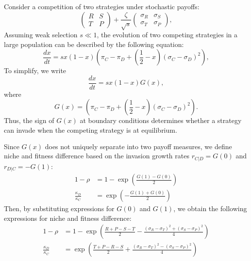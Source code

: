 \documentclass[12pt]{article}
\begin{document}
Consider a competition of two strategies under stochastic payoffs:
\begin{equation}
\begin{pmatrix}
R & S \\
T & P
\end{pmatrix} +
\frac{\zeta}{\sqrt{s}} \begin{pmatrix}
\sigma_R & \sigma_S \\
\sigma_T & \sigma_P
\end{pmatrix}, 
\end{equation}
Assuming weak selection $s\ll 1$, the evolution of two competing strategies in a large population can be described by the following equation:
\begin{equation}
\frac{dx}{dt} = s x (1-x) \left(\pi_C - \pi_D + \left(\frac{1}{2} - x \right) (\sigma_C - \sigma_D)^2 \right),
\end{equation}
To simplify, we write
\begin{equation}
\frac{dx}{dt} = s x (1-x) G(x),
\end{equation}
where
\begin{equation}
G(x) = \left(\pi_C - \pi_D + \left(\frac{1}{2} - x \right) (\sigma_C - \sigma_D)^2 \right).
\end{equation}
Thus, the sign of $G(x)$ at boundary conditions determines whether a strategy can invade when the competing strategy is at equilibrium.

Since $G(x)$ does not uniquely separate into two payoff measures, we define niche and fitness difference based on the invasion growth rates $r_{C|D} = G(0)$ and $r_{D|C} = -G(1)$:
\begin{align}
1 -\rho &= 1 - \exp\left(\frac{G(1)-G(0)}{2}\right)\\
\frac{\kappa_D}{\kappa_C} &= \exp\left(-\frac{G(1)+G(0)}{2}\right)
\end{align}
Then, by substituting expressions for $G(0)$ and $G(1)$, we obtain the following expressions for niche and fitness difference:
\begin{align}
1- \rho &= 1-\exp\left(\frac{R+P-S-T}{2} - \frac{(\sigma_R - \sigma_T)^2 + (\sigma_S - \sigma_P)^2}{4} \right)\\
\frac{\kappa_D}{\kappa_C} &= \exp\left(\frac{T+P-R-S}{2} + \frac{(\sigma_R - \sigma_T)^2 - (\sigma_S - \sigma_P)^2}{4} \right)
\end{align}
\end{document}
